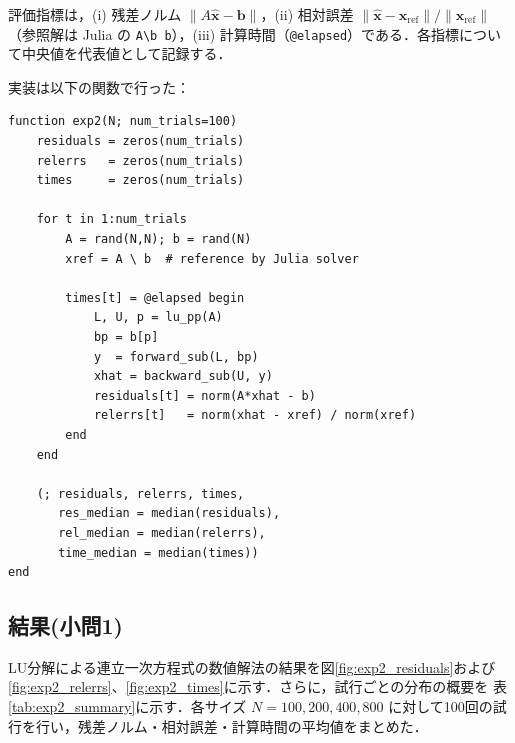 \documentclass[a4paper,11pt]{ltjsarticle}
\begin{document}
評価指標は，(i) 残差ノルム $\|A\hat{\boldsymbol{x}}-\boldsymbol{b}\|$，(ii) 相対誤差 $\|\hat{\boldsymbol{x}}-\boldsymbol{x}_{\mathrm{ref}}\|/\|\boldsymbol{x}_{\mathrm{ref}}\|$（参照解は Julia の \verb|A\b b|），(iii) 計算時間（\verb|@elapsed|）である．各指標について中央値を代表値として記録する．

実装は以下の関数で行った：
\begin{verbatim}
function exp2(N; num_trials=100)
    residuals = zeros(num_trials)
    relerrs   = zeros(num_trials)
    times     = zeros(num_trials)

    for t in 1:num_trials
        A = rand(N,N); b = rand(N)
        xref = A \ b  # reference by Julia solver

        times[t] = @elapsed begin
            L, U, p = lu_pp(A)
            bp = b[p]
            y  = forward_sub(L, bp)
            xhat = backward_sub(U, y)
            residuals[t] = norm(A*xhat - b)
            relerrs[t]   = norm(xhat - xref) / norm(xref)
        end
    end

    (; residuals, relerrs, times,
       res_median = median(residuals),
       rel_median = median(relerrs),
       time_median = median(times))
end
\end{verbatim}

\subsection{結果(小問1)}
LU分解による連立一次方程式の数値解法の結果を図\ref{fig:exp2_residuals}および\ref{fig:exp2_relerrs}、\ref{fig:exp2_times}に示す．さらに，試行ごとの分布の概要を 表\ref{tab:exp2_summary}に示す．各サイズ $N=100, 200, 400, 800$ に対して100回の試行を行い，残差ノルム・相対誤差・計算時間の平均値をまとめた．
\end{document}
